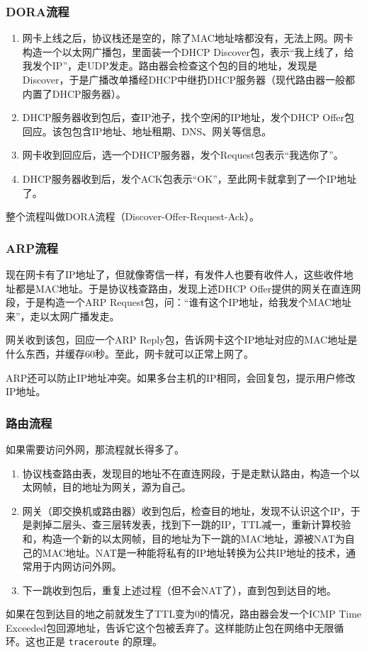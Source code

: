 \documentclass[fontset=none,aspectratio=1610]{ctexbeamer}
\begin{document}
\begin{frame}
    \frametitle{DORA流程}

    \begin{enumerate}
        \item 网卡上线之后，协议栈还是空的，除了MAC地址啥都没有，无法上网。网卡构造一个以太网广播包，里面装一个DHCP Discover包，表示“我上线了，给我发个IP”，走UDP发走。路由器会检查这个包的目的地址，发现是Discover，于是广播改单播经DHCP中继扔DHCP服务器（现代路由器一般都内置了DHCP服务器）。
        \item DHCP服务器收到包后，查IP池子，找个空闲的IP地址，发个DHCP Offer包回应。该包包含IP地址、地址租期、DNS、网关等信息。
        \item 网卡收到回应后，选一个DHCP服务器，发个Request包表示“我选你了”。
        \item DHCP服务器收到后，发个ACK包表示“OK”，至此网卡就拿到了一个IP地址了。
    \end{enumerate}
    
    整个流程叫做DORA流程（Discover-Offer-Request-Ack）。

\end{frame}

\begin{frame}
    \frametitle{ARP流程}

    现在网卡有了IP地址了，但就像寄信一样，有发件人也要有收件人，这些收件地址都是MAC地址。于是协议栈查路由，发现上述DHCP Offer提供的网关在直连网段，于是构造一个ARP Request包，问：“谁有这个IP地址，给我发个MAC地址来”，走以太网广播发走。

    网关收到该包，回应一个ARP Reply包，告诉网卡这个IP地址对应的MAC地址是什么东西，并缓存60秒。至此，网卡就可以正常上网了。

    ARP还可以防止IP地址冲突。如果多台主机的IP相同，会回复包，提示用户修改IP地址。
\end{frame}

\begin{frame}
    \frametitle{路由流程}

    如果需要访问外网，那流程就长得多了。
    \begin{enumerate}
        \item 协议栈查路由表，发现目的地址不在直连网段，于是走默认路由，构造一个以太网帧，目的地址为网关，源为自己。
        \item 网关（即交换机或路由器）收到包后，检查目的地址，发现不认识这个IP，于是剥掉二层头、查三层转发表，找到下一跳的IP，TTL减一，重新计算校验和，构造一个新的以太网帧，目的地址为下一跳的MAC地址，源被NAT为自己的MAC地址。NAT是一种能将私有的IP地址转换为公共IP地址的技术，通常用于内网访问外网。
        \item 下一跳收到包后，重复上述过程（但不会NAT了），直到包到达目的地。
    \end{enumerate}
    如果在包到达目的地之前就发生了TTL变为0的情况，路由器会发一个ICMP Time Exceeded包回源地址，告诉它这个包被丢弃了。这样能防止包在网络中无限循环。这也正是 \texttt{traceroute} 的原理。

\end{frame}
\end{document}
